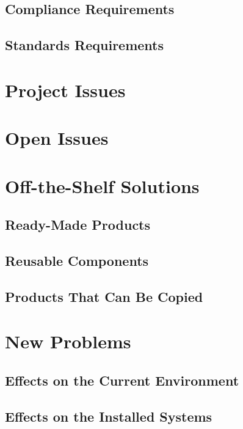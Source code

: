 \documentclass{article}
\begin{document}
\subsection{Compliance Requirements}


\subsection{Standards Requirements}


\section*{Project Issues}

\section{Open Issues}

\section{Off-the-Shelf Solutions}

\subsection{Ready-Made Products}


\subsection{Reusable Components}


\subsection{Products That Can Be Copied}


\section{New Problems}

\subsection{Effects on the Current Environment}


\subsection{Effects on the Installed Systems}
\end{document}
